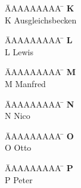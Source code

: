 \vspace*{-1.5cm}
\begin{tabbing}
	\hspace{0.0cm}  \= AAAAAAAAA \=       \hspace{2cm} \kill
	\>\textbf{K} 	\> \\
	\>K 			\>  Ausgleichsbecken\\
\end{tabbing}

\vspace*{-1.5cm}
\begin{tabbing}
	\hspace{0.0cm}  \= AAAAAAAAA \=       \hspace{2cm} \kill
	\>\textbf{L} 	\> \\
	\>L 			\>  Lewis\\
\end{tabbing}

\vspace*{-1.5cm}
\begin{tabbing}
	\hspace{0.0cm}  \= AAAAAAAAA \=       \hspace{2cm} \kill
	\>\textbf{M} 	\> \\
	\>M 			\>  Manfred\\
\end{tabbing} 

\vspace*{-1.5cm}
\begin{tabbing}
	\hspace{0.0cm}  \= AAAAAAAAA \=       \hspace{2cm} \kill
	\>\textbf{N} 	\> \\
	\>N 			\>  Nico\\
\end{tabbing}

\vspace*{-1.5cm}
\begin{tabbing}
	\hspace{0.0cm}  \= AAAAAAAAA \=       \hspace{2cm} \kill
	\>\textbf{O} 	\> \\
	\>O 			\>  Otto\\
\end{tabbing}

\vspace*{-1.5cm}
\begin{tabbing}
	\hspace{0.0cm}  \= AAAAAAAAA \=       \hspace{2cm} \kill
	\>\textbf{P} 	\> \\
	\>P 			\>  Peter\\
\end{tabbing}

